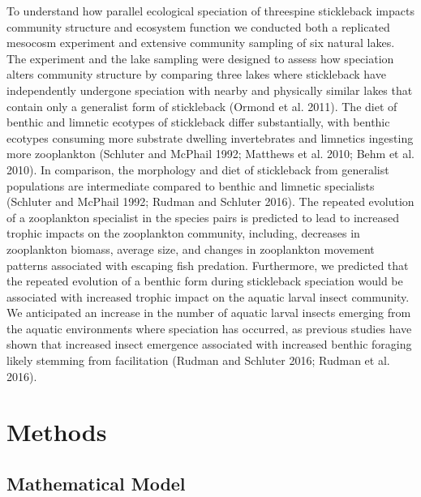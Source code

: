 \documentclass[11pt]{article}
\begin{document}
To understand how parallel ecological speciation of threespine stickleback impacts community structure and ecosystem function we conducted both a replicated mesocosm experiment and extensive community sampling of six natural lakes.  The experiment and the lake sampling were designed to assess how speciation alters community structure by comparing three lakes where stickleback have independently undergone speciation with nearby and physically similar lakes that contain only a generalist form of stickleback (Ormond et al. 2011).  The diet of benthic and limnetic ecotypes of stickleback differ substantially, with benthic ecotypes consuming more substrate dwelling invertebrates and limnetics ingesting more zooplankton (Schluter and McPhail 1992; Matthews et al. 2010; Behm et al. 2010).  In comparison, the morphology and diet of stickleback from generalist populations are intermediate compared to benthic and limnetic specialists (Schluter and McPhail 1992; Rudman and Schluter 2016).  The repeated evolution of a zooplankton specialist in the species pairs is predicted to lead to increased trophic impacts on the zooplankton community, including, decreases in zooplankton biomass, average size, and changes in zooplankton movement patterns associated with escaping fish predation.  Furthermore, we predicted that the repeated evolution of a benthic form during stickleback speciation would be associated with increased trophic impact on the aquatic larval insect community.  We anticipated an increase in the number of aquatic larval insects emerging from the aquatic environments where speciation has occurred, as previous studies have shown that increased insect emergence associated with increased benthic foraging likely stemming from facilitation (Rudman and Schluter 2016; Rudman et al. 2016).  


\section*{Methods}

\subsection*{Mathematical Model}
\end{document}
